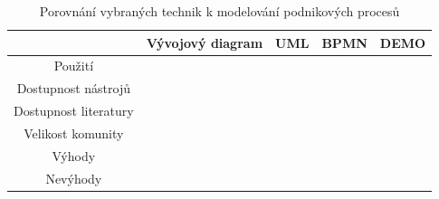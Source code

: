 \documentclass[]{article}
\begin{document}
\begin{table}[H]\centering
  \caption{Porovnání vybraných technik k modelování podnikových procesů}
  \label{tab:cmm}
  \begin{tabular}{| c | c | c | c | c |}
    \hline
    & \textbf{Vývojový diagram} & \textbf{UML} & \textbf{BPMN} & \textbf{DEMO}  \\ \hline
    Použití & & & & \\ \hline
    Dostupnost nástrojů & & & & \\ \hline
    Dostupnost literatury & & & & \\  \hline
    Velikost komunity & & & & \\  \hline
    Výhody & & & & \\  \hline
    Nevýhody & & & & \\  \hline
  \end{tabular}
\end{table}

\nocite{*}


\end{document}
